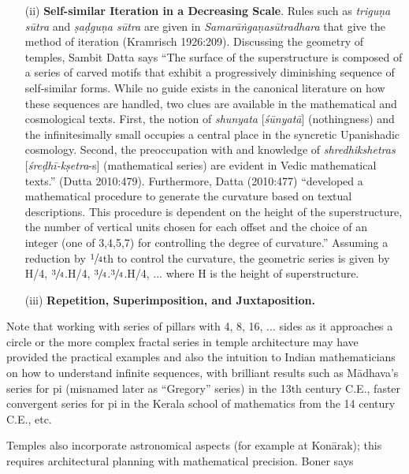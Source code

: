 \begin{itemize}
\item[(ii)] \textbf{Self-similar Iteration in a Decreasing Scale}. Rules such as \textsl{triguṇa sūtra} and \textsl{ṣaḍguṇa sūtra} are given in \textsl{Samarāṅgaṇasūtradhara} that give the method of iteration (Kramrisch 1926:209).  Discussing the geometry of temples, Sambit Datta says “The surface of the superstructure is composed of a series of carved motifs that exhibit a progressively diminishing sequence of self-similar forms. While no guide exists in the canonical literature on how these sequences are handled, two clues are available in the mathematical and cosmological texts. First, the notion of \textsl{shunyata} [\textsl{śūnyatā}] (nothingness) and the infinitesimally small occupies a central place in the syncretic Upanishadic cosmology. Second, the preoccupation with and knowledge of \textsl{shredhikshetras} [\textsl{śreḍhī-kṣetra}-s] (mathematical series) are evident in Vedic mathematical texts.” (Dutta 2010:479). Furthermore, Datta (2010:477) “developed a mathematical procedure to generate the curvature based on textual descriptions. This procedure is dependent on the height of the superstructure, the number of vertical units chosen for each offset and the choice of an integer (one of 3,4,5,7) for controlling the degree of curvature.” Assuming a reduction by $\sfrac{1}{4}$th to control the curvature, the geometric series is given by H/4, $\sfrac{3}{4}$.H/4, $\sfrac{3}{4}$.$\sfrac{3}{4}$.H/4, ... where H is the height of superstructure.

\item[(iii)] \textbf{Repetition, Superimposition, and Juxtaposition.}
\end{itemize}

Note that working with series of pillars with 4, 8, 16, ... sides as it approaches a circle or the more complex fractal series in temple architecture may have provided the practical examples and also the intuition to Indian mathematicians on how to understand infinite sequences, with brilliant results such as Mādhava’s series for pi (misnamed later as “Gregory” series) in the 13th century C.E., faster convergent series for pi in the Kerala school of mathematics from the 14 century C.E., etc.

Temples also incorporate astronomical aspects (for example at Konārak); this requires architectural planning with mathematical precision. Boner says 

